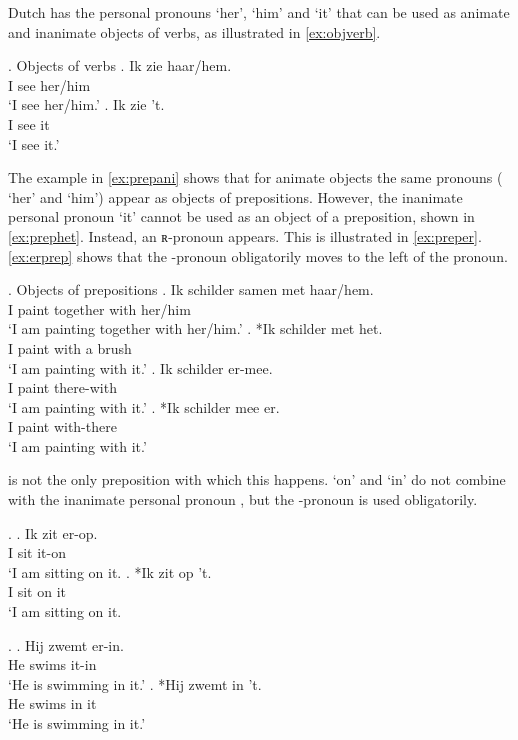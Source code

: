 \documentclass{article}
\begin{document}
Dutch has the personal pronouns  `her',  `him' and  `it' that can be used as animate and inanimate objects of verbs, as illustrated in \ref{ex:objverb}.

 \ex. Objects of verbs \label{ex:objverb}
 \ag. Ik zie haar/hem.\\
  I see her/him\\
  `I see her/him.'\label{ex:aniobj}
 \bg. Ik zie 't.\\
  I see it\\
  `I see it.'\label{ex:inaniobj}

The example in \ref{ex:prepani} shows that for animate objects the same pronouns ( `her' and  `him') appear as objects of prepositions. However, the inanimate personal pronoun  `it' cannot be used as an object of a preposition, shown in \ref{ex:prephet}. Instead, an ʀ-pronoun appears. This is illustrated in \ref{ex:preper}. \ref{ex:erprep} shows that the -pronoun obligatorily moves to the left of the pronoun.

\ex. Objects of prepositions \label{ex:objprep}
\ag. Ik schilder samen met haar/hem.\\
 I paint together with her/him\\
 `I am painting together with her/him.'\label{ex:prepani}
\bg. *Ik schilder met het.\\
 I paint with a brush\\
 `I am painting with it.'\label{ex:prephet}
\bg. Ik schilder er-mee.\\
 I paint there-with\\
 `I am painting with it.'\label{ex:preper}
\bg. *Ik schilder mee er.\\
 I paint with-there\\
 `I am painting with it.'\label{ex:erprep}

 is not the only preposition with which this happens.  `on' and  `in' do not combine with the inanimate personal pronoun , but the -pronoun is used obligatorily.

\ex.
\ag. Ik zit er-op.\\
 I sit it-on\\
 `I am sitting on it.
\bg. *Ik zit op 't.\\
 I sit on it\\
 `I am sitting on it.

\ex.
 \ag. Hij zwemt er-in.\\
  He swims it-in\\
  `He is swimming in it.'
 \bg. *Hij zwemt in 't.\\
  He swims in it\\
  `He is swimming in it.'
\end{document}

